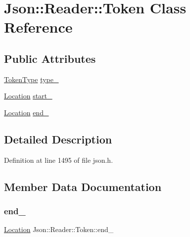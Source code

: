 \hypertarget{class_json_1_1_reader_1_1_token}{}\section{Json\+:\+:Reader\+:\+:Token Class Reference}
\label{class_json_1_1_reader_1_1_token}
\subsection*{Public Attributes}
\begin{DoxyCompactItemize}
\item 
\hyperlink{class_json_1_1_reader_aa35e6ab574dc399a0a645ad98ed66bc9}{Token\+Type} \hyperlink{class_json_1_1_reader_1_1_token_aa0f06d0105ec3d8cb42427c66b991bad}{type\+\_\+}
\item 
\hyperlink{class_json_1_1_reader_a46795b5b272bf79a7730e406cb96375a}{Location} \hyperlink{class_json_1_1_reader_1_1_token_aff87d677b9ac4b52542a00b0d6673249}{start\+\_\+}
\item 
\hyperlink{class_json_1_1_reader_a46795b5b272bf79a7730e406cb96375a}{Location} \hyperlink{class_json_1_1_reader_1_1_token_a7d3bc0fa40097f435d184be4b1fd5ae1}{end\+\_\+}
\end{DoxyCompactItemize}


\subsection{Detailed Description}


Definition at line 1495 of file json.\+h.



\subsection{Member Data Documentation}
\hypertarget{class_json_1_1_reader_1_1_token_a7d3bc0fa40097f435d184be4b1fd5ae1}{}\label{class_json_1_1_reader_1_1_token_a7d3bc0fa40097f435d184be4b1fd5ae1} 
\subsubsection{\texorpdfstring{end\+\_\+}{end\_}}
{\footnotesize\ttfamily \hyperlink{class_json_1_1_reader_a46795b5b272bf79a7730e406cb96375a}{Location} Json\+::\+Reader\+::\+Token\+::end\+\_\+}




